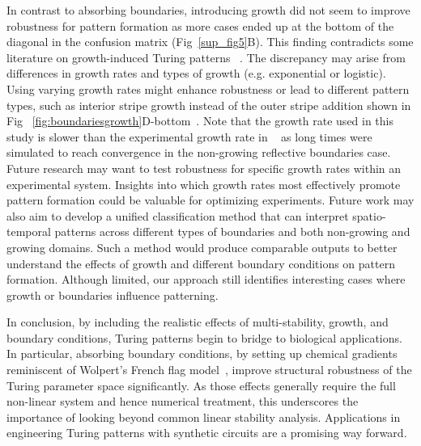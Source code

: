 In contrast to absorbing boundaries, introducing growth did not seem to improve robustness for pattern formation as more cases ended up at the bottom of the diagonal in the confusion matrix (Fig~\ref{sup_fig5}B).
This finding contradicts some literature on growth-induced Turing patterns ~\parencite{gaffney2010}.
The discrepancy may arise from differences in growth rates and types of growth (e.g. exponential or logistic).
Using varying growth rates might enhance robustness or lead to different pattern types, such as interior stripe growth instead of the outer stripe addition shown in Fig ~\ref{fig:boundariesgrowth}D-bottom~\parencite{konow2019turing}. Note that the growth rate used in this study is slower than the experimental growth rate in ~\parencite{Oliver2023} as long times were simulated to reach convergence in the non-growing reflective boundaries case. Future research may want to test robustness for specific growth rates within an experimental system. Insights into which growth rates most effectively promote pattern formation could be valuable for optimizing experiments.
Future work may also aim to develop a unified classification method that can interpret spatio-temporal patterns across different types of boundaries and both non-growing and growing domains. Such a method would produce comparable outputs to better understand the effects of growth and different boundary conditions on pattern formation.
Although limited, our approach still identifies interesting cases where growth or boundaries influence patterning.


In conclusion, by including the realistic effects of multi-stability, growth, and boundary conditions, Turing patterns begin to bridge to biological applications. In particular, absorbing boundary conditions, by setting up chemical gradients reminiscent of Wolpert's French flag model~\parencite{wolpert1969positional}, improve structural robustness of the Turing parameter space significantly. As those effects generally require the full non-linear system and hence numerical treatment, this underscores the importance of looking beyond common linear stability analysis. Applications in engineering Turing patterns with synthetic circuits are a promising way forward.

